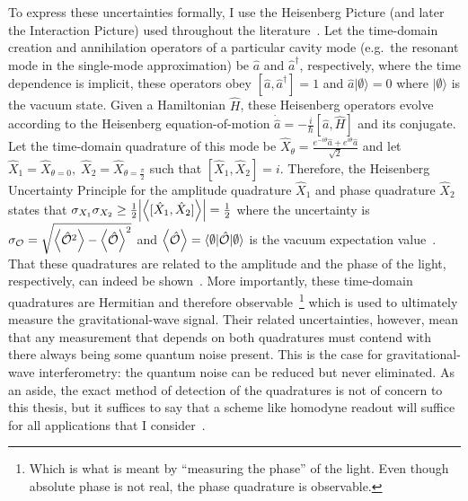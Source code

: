 To express these uncertainties formally, I use the Heisenberg Picture (and later the Interaction Picture) used throughout the literature~\cite{Danilishin,}. Let the time-domain creation and annihilation operators of a particular cavity mode (e.g.\ the resonant mode in the single-mode approximation) be $\hat{a}$ and $\hat{a}^\dag$, respectively, where the time dependence is implicit, these operators obey $[\hat{a},\hat{a}^\dag]=1$ and $\hat{a}\lvert\emptyset\rangle=0$ where $\lvert\emptyset\rangle$ is the vacuum state. Given a Hamiltonian $\hat H$, these Heisenberg operators evolve according to the Heisenberg equation-of-motion $\dot{\hat{a}}=-\frac{i}{\hbar} [\hat a, \hat H]$ and its conjugate. Let the time-domain quadrature of this mode be $\hat{X}_\theta=\frac{e^{-i \theta}\hat{a}+e^{i \theta}\hat{a}}{\sqrt 2}$ and let $\hat{X}_1=\hat{X}_{\theta=0},\; \hat{X}_2=\hat{X}_{\theta=\frac{\pi}{2}}$ such that $[\hat{X}_1,\hat{X}_2]=i$. Therefore, the Heisenberg Uncertainty Principle for the amplitude quadrature $\hat{X}_1$ and phase quadrature $\hat{X}_2$ states that $\sigma_{X_1}\sigma_{X_2}\geq\frac{1}{2}\abs{\ev{[\hat{X}_1,\hat{X}_2]}}=\frac{1}{2}$  where the uncertainty is $\sigma_\mathcal{O}=\sqrt{\ev{\hat{\mathcal{O}}^2}-\ev{\hat{\mathcal{O}}}^2}$ and $\ev{\hat{\mathcal{O}}}=\langle\emptyset\lvert\hat{\mathcal{O}}\rvert\emptyset\rangle$ is the vacuum expectation value~\cite{}. That these quadratures are related to the amplitude and the phase of the light, respectively, can indeed be shown~\cite{Danilishin}. More importantly, these time-domain quadratures are Hermitian and therefore observable~\footnote{Which is what is meant by ``measuring the phase'' of the light. Even though absolute phase is not real, the phase quadrature is observable.} which is used to ultimately measure the gravitational-wave signal. Their related uncertainties, however, mean that any measurement that depends on both quadratures must contend with there always being some quantum noise present. This is the case for gravitational-wave interferometry: the quantum noise can be reduced but never eliminated. 
As an aside, the exact method of detection of the quadratures is not of concern to this thesis, but it suffices to say that a scheme like homodyne readout will suffice for all applications that I consider~\cite{}.

